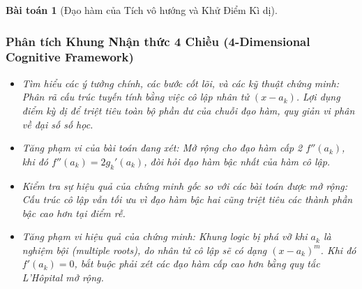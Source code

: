 \documentclass{article}
\newtheorem{baitoan}{Bài toán}
\begin{document}
\begin{baitoan}[Đạo hàm của Tích vô hướng và Khử Điểm Kì dị]
 \subsubsection*{Phân tích Khung Nhận thức 4 Chiều (4-Dimensional Cognitive Framework)}
 \begin{itemize}
 \item \textit{Tìm hiểu các ý tưởng chính, các bước cốt lõi, và các kỹ thuật chứng minh}: Phân rã cấu trúc tuyến tính bằng việc cô lập nhân tử $(x-a_k)$. Lợi dụng điểm kỳ dị để triệt tiêu toàn bộ phần dư của chuỗi đạo hàm, quy giản vi phân về đại số số học.
 \item \textit{Tăng phạm vi của bài toán đang xét}: Mở rộng cho đạo hàm cấp 2 $f''(a_k)$, khi đó $f''(a_k) = 2 g_k'(a_k)$, đòi hỏi đạo hàm bậc nhất của hàm cô lập.
 \item \textit{Kiểm tra sự hiệu quả của chứng minh gốc so với các bài toán được mở rộng}: Cấu trúc cô lập vẫn tối ưu vì đạo hàm bậc hai cũng triệt tiêu các thành phần bậc cao hơn tại điểm rễ.
 \item \textit{Tăng phạm vi hiệu quả của chứng minh}: Khung logic bị phá vỡ khi $a_k$ là nghiệm bội (multiple roots), do nhân tử cô lập sẽ có dạng $(x-a_k)^m$. Khi đó $f'(a_k) = 0$, bắt buộc phải xét các đạo hàm cấp cao hơn bằng quy tắc L'Hôpital mở rộng.
 \end{itemize}
\end{baitoan}

\end{document}
